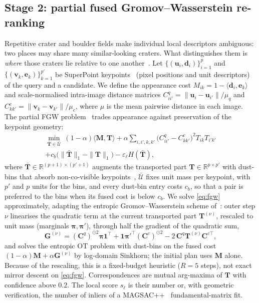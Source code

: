 \subsection{Stage 2: partial fused Gromov--Wasserstein re-ranking}\label{sec:fgw}
Repetitive crater and boulder fields make individual local descriptors ambiguous: two places may
share many similar-looking craters. What distinguishes them is \emph{where} those craters lie
relative to one another~\cite{torii2013visual}. Let $\{(\mathbf{u}_i,\mathbf{d}_i)\}_{i=1}^{p}$
and $\{(\mathbf{v}_k,\mathbf{e}_k)\}_{k=1}^{p'}$ be SuperPoint keypoints~\cite{detone2018superpoint}
(pixel positions and unit descriptors) of the query and a candidate. We define the appearance cost
$M_{ik}=1-\langle\mathbf{d}_i,\mathbf{e}_k\rangle$ and scale-normalised intra-image distance matrices
$C^{q}_{ii'}=\|\mathbf{u}_i-\mathbf{u}_{i'}\|/\mu_q$ and $C^{c}_{kk'}=\|\mathbf{v}_k-\mathbf{v}_{k'}\|/\mu_c$,
where $\mu$ is the mean pairwise distance in each image. The partial FGW
problem~\cite{vayer2019fgw,chapel2020partial} trades appearance against preservation of the
keypoint geometry:
\begin{multline}
\min_{\bar{\mathbf{T}}\in\bar{\mathcal{U}}}\ (1-\alpha)\langle\mathbf{M},\mathbf{T}\rangle
+\alpha\!\!\sum_{i,i',k,k'}\!\!\big(C^{q}_{ii'}-C^{c}_{kk'}\big)^2T_{ik}T_{i'k'}\\
+c_b\big(\|\bar{\mathbf{T}}\|_1-\|\mathbf{T}\|_1\big)-\varepsilon_\ell H(\bar{\mathbf{T}}),
\label{eq:fgw}
\end{multline}
where $\bar{\mathbf{T}}\in\mathbb{R}^{(p+1)\times(p'+1)}$ augments the transported part
$\mathbf{T}\in\mathbb{R}^{p\times p'}$ with dust-bins that absorb non-co-visible
keypoints~\cite{sarlin2020superglue}, $\bar{\mathcal{U}}$ fixes unit mass per keypoint, with $p'$ and
$p$ units for the bins, and every dust-bin entry costs $c_b$, so that a pair is preferred to the bins
when its fused cost is below $c_b$. We solve \eqref{eq:fgw} approximately, adapting the entropic
Gromov--Wasserstein scheme of~\cite{peyre2016gromov}: outer step $\nu$ linearises the quadratic term at
the current transported part $\mathbf{T}^{(\nu)}$, rescaled to unit mass (marginals
$\boldsymbol{\pi},\boldsymbol{\pi}'$), through half the gradient of the quadratic sum,
\begin{equation}
\mathbf{G}^{(\nu)}=(\mathbf{C}^{q})^{\odot2}\boldsymbol{\pi}\mathbf{1}^\top+\mathbf{1}\boldsymbol{\pi}'^\top(\mathbf{C}^{c})^{\odot2}-2\,\mathbf{C}^{q}\mathbf{T}^{(\nu)}\mathbf{C}^{c\top},
\label{eq:gwgrad}
\end{equation}
and solves the entropic OT problem with dust-bins on the fused cost
$(1-\alpha)\mathbf{M}+\alpha\mathbf{G}^{(\nu)}$ by log-domain Sinkhorn; the initial plan uses
$\mathbf{M}$ alone. Because of the rescaling, this is a fixed-budget heuristic ($R=5$ steps), not
exact mirror descent on \eqref{eq:fgw}. Correspondences are mutual arg-maxima of $\mathbf{T}$ with confidence above
$0.2$. The local score $s_\ell$ is their number or, with geometric verification, the number of
inliers of a MAGSAC++~\cite{barath2020magsac} fundamental-matrix fit.


